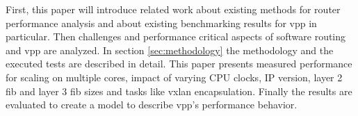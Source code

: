 
First, this paper will introduce related work about existing methods
for router performance analysis and about existing benchmarking
results for \Ac{vpp} in particular. Then challenges and performance
critical aspects of software routing and \Ac{vpp} are analyzed. In
section \ref{sec:methodology} the methodology and the executed tests
are described in detail. This paper presents measured performance for
scaling on multiple cores, impact of varying CPU clocks, IP version,
layer 2 \Ac{fib} and layer 3 \Ac{fib} sizes and tasks like \Ac{vxlan}
encapsulation. Finally the results are evaluated to create a model to
describe \Ac{vpp}'s performance behavior.
